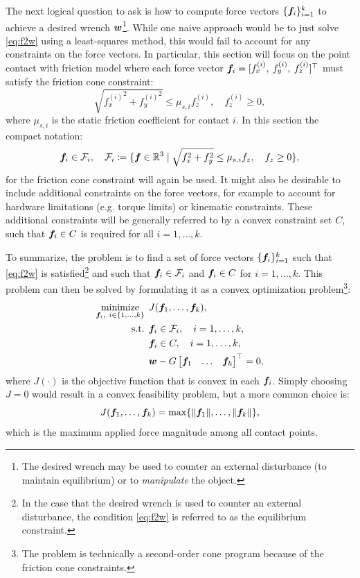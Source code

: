 The next logical question to ask is how to compute force vectors $\{\bm{f}_i\}_{i=1}^k$ to achieve a desired wrench $\bm{w}$\footnote{The desired wrench may be used to counter an external disturbance (to maintain equilibrium) or to \textit{manipulate} the object.}. While one naive approach would be to just solve \eqref{eq:f2w} using a least-squares method, this would fail to account for any constraints on the force vectors. In particular, this section will focus on the point contact with friction model where each force vector $\bm{f}_i = [f^{(i)}_x,\: f^{(i)}_y,\: f^{(i)}_z]^\top $ must satisfy the friction cone constraint:
\begin{equation*}
\sqrt{{f^{(i)}_x}^2 + {f^{(i)}_y}^2} \leq \mu_{s,i} f^{(i)}_z, \quad f^{(i)}_z \geq 0,
\end{equation*}
where $\mu_{s,i}$ is the static friction coefficient for contact $i$. In this section the compact notation:
\begin{equation*}
\bm{f}_i \in \mathcal{F}_i, \quad \mathcal{F}_i \coloneqq \{\bm{f} \in \mathbb{R}^3 \mid \sqrt{f_x^2 + f_y^2} \leq \mu_{s,i} f_z, \quad f_z \geq 0\},
\end{equation*}
for the friction cone constraint will again be used.
It might also be desirable to include additional constraints on the force vectors, for example to account for hardware limitations (e.g. torque limits) or kinematic constraints. These additional constraints will be generally referred to by a convex constraint set $C$, such that $\bm{f}_i \in C$ is required for all $i = 1,\dots,k$. 

To summarize, the problem is to find a set of force vectors $\{\bm{f}_i\}_{i=1}^k$ such that \eqref{eq:f2w} is satisfied\footnote[][-3\baselineskip]{In the case that the desired wrench is used to counter an external disturbance, the condition \eqref{eq:f2w} is referred to as the equilibrium constraint.} and such that $\bm{f}_i \in \mathcal{F}_i$ and $\bm{f}_i \in C$ for $i = 1,\dots,k$. This problem can then be solved by formulating it as a convex optimization problem\cite{BoydWegbreit2007}\footnote{The problem is technically a second-order cone program because of the friction cone constraints.}:
\begin{equation} \label{eq:contactopt}
\begin{split}
\underset{\bm{f}_i, \:\: i \in \{1, \dots, k\}}{\text{minimize}} \:\: & J(\bm{f}_1, \dots, \bm{f}_k),\\
\text{s.t.} \:\:& \bm{f}_i \in \mathcal{F}_i, \quad i = 1,\dots,k, \\
&\bm{f}_i \in C, \quad i = 1,\dots,k, \\
&\bm{w} - G\begin{bmatrix} 
    \bm{f}_1 & \dots & \bm{f}_k
    \end{bmatrix}^\top  = 0,
\end{split}
\end{equation}
where $J(\cdot)$ is the objective function that is convex in each $\bm{f}_i$. Simply choosing $J = 0$ would result in a convex feasibility problem, but a more common choice is:
\begin{equation*}
J(\bm{f}_1, \dots, \bm{f}_k) = \max \{\lVert \bm{f}_1 \rVert, \dots, \lVert \bm{f}_k \rVert\},
\end{equation*}
which is the maximum applied force magnitude among all contact points.

